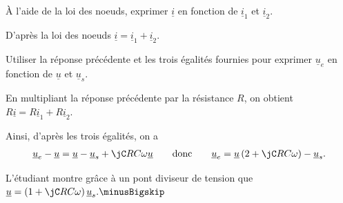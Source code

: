 \hauteurLargeurCadreReponse		{7mm}{3cm}

\begin{enonce}
	À l'aide de la loi des noeuds, exprimer $\underline{i}$ en fonction de $\underline{i}_1$ et $\underline{i}_2$.	
\end{enonce}


\begin{corrige}
D'après la loi des noeuds $\underline{i} = \underline{i}_1 + \underline{i}_2$.
\end{corrige}


\hauteurLargeurCadreReponse		{7mm}{6cm}


\begin{enonce}
	Utiliser la réponse précédente et les trois égalités fournies pour exprimer $\underline{u}_e$ en fonction de $\underline{u}$ et $\underline{u}_s$.\smallskip\\\mbox{}
\end{enonce}


\begin{corrige}
En multipliant la réponse précédente par la résistance $R$, on obtient
$R\underline{i} = R\underline{i}_1 + R\underline{i}_2$. 

Ainsi, d'après les trois égalités, on a
\begin{align*}
	\underline{u}_e - \underline{u} = \underline{u} - \underline{u}_s + \jC RC \omega \underline{u}
	\qquad \text{donc} \qquad
	\underline{u}_e = \underline{u} \left( 2 + \jC RC \omega\right) - \underline{u}_s.
\end{align*}
\end{corrige}



\pauseEntrainement

\medskip

L'étudiant montre grâce à un pont diviseur de tension que 
\(
\underline{u}=\left(1+\jC RC\omega\right)\underline{u}_s. \minusBigskip
\)

